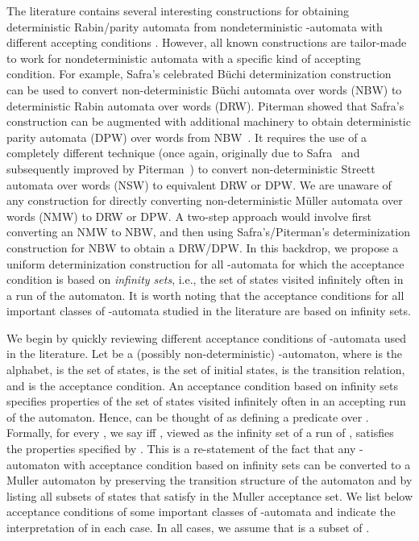 \documentclass[3p]{elsarticle}
\begin{document}
The literature contains several interesting constructions for obtaining
deterministic Rabin/parity automata from nondeterministic -automata with
different accepting conditions \cite{buchi73, eilenberg74, choueka74, rabin72,
tb73, sch75, thomas81, emerson-sistla, safra, safra06, muller-schupp,
schewe-det, piterman, kaewil, colcombet}. However, all known constructions are
tailor-made to work for nondeterministic automata with a specific kind of
accepting condition. For example, Safra's celebrated B\"{u}chi determinization
construction~\cite{safra, safrathesis} can be used to convert non-deterministic
B\"{u}chi automata over words (NBW) to deterministic Rabin automata over words
(DRW).  Piterman showed that Safra's construction can be augmented with
additional machinery to obtain deterministic parity automata (DPW) over words
from NBW~\cite{piterman, liu-wang}.  It requires the use of a completely
different technique (once again, originally due to
Safra~\cite{safra-stoc92,safra06} and subsequently improved by
Piterman~\cite{piterman}) to convert non-deterministic Streett automata over
words (NSW) to equivalent DRW or DPW.  We are unaware of any construction for
directly converting non-deterministic M\"{u}ller automata over words (NMW) to
DRW or DPW.  A two-step approach would involve first converting an NMW to NBW,
and then using Safra's/Piterman's determinization construction for NBW to obtain
a DRW/DPW.  In this backdrop, we propose a uniform determinization construction
for all -automata for which the acceptance condition is based on
\emph{infinity sets}, i.e., the set of states visited infinitely often in a run
of the automaton.  It is worth noting that the acceptance conditions for all
important classes of -automata studied in the literature are based on
infinity sets.

We begin by quickly reviewing different acceptance conditions of
-automata used in the literature.  Let  be a (possibly non-deterministic) -automaton,
where  is the alphabet,  is the set of states,
 is the set of initial states,  is the transition relation, and  is the
acceptance condition.
An acceptance condition  based on infinity sets specifies properties of
the set of states visited infinitely often in an accepting run of the automaton.
Hence,  can be thought of as defining a predicate  over .
Formally, for every , we say  iff , viewed
as the infinity set of a run of , satisfies the properties specified by
. This is a re-statement of the fact that any -automaton with
acceptance condition based on infinity sets can be converted to a Muller
automaton by preserving the transition structure of the automaton and by listing
all subsets of states that satisfy  in the Muller acceptance set.  We list
below acceptance conditions of some important classes of -automata and
indicate the interpretation of  in each case.  In all cases, we assume
that  is a subset of .
\end{document}
